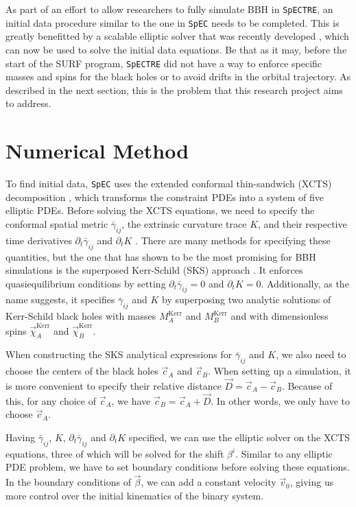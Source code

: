 \documentclass{../document}
\begin{document}
	As part of an effort to allow researchers to fully simulate BBH in {\tt SpECTRE}, an initial data procedure similar to the one in {\tt SpEC} needs to be completed. This is greatly benefitted by a scalable elliptic solver that was recently developed \cite{Vu}, which can now be used to solve the initial data equations. Be that as it may, before the start of the SURF program, {\tt SpECTRE} did not have a way to enforce specific masses and spins for the black holes or to avoid drifts in the orbital trajectory. As described in the next section, this is the problem that this research project aims to address.
  
  \section{Numerical Method}

  To find initial data, {\tt SpEC} uses the extended conformal thin-sandwich (XCTS) decomposition \cite{Serguei}, which transforms the constraint PDEs into a system of five elliptic PDEs. Before solving the XCTS equations, we need to specify the conformal spatial metric $\bar\gamma_{ij}$, the extrinsic curvature trace $K$, and their respective time derivatives $\partial_t \bar\gamma_{ij}$ and $\partial_t K$ \cite{BaumgarteShapiro}. There are many methods for specifying these quantities, but the one that has shown to be the most promising for BBH simulations is the superposed Kerr-Schild (SKS) approach \cite{Lovelace2008}. It enforces quasiequilibrium conditions by setting $\partial_t \bar\gamma_{ij}=0$ and $\partial_t K=0$. Additionally, as the name suggests, it specifies $\bar\gamma_{ij}$ and $K$ by superposing two analytic solutions of Kerr-Schild black holes with masses $M^\text{Kerr}_A$ and $M^\text{Kerr}_B$ and with dimensionless spins $\vec\chi^\text{Kerr}_A$ and $\vec\chi^\text{Kerr}_B$.

  When constructing the SKS analytical expressions for $\bar\gamma_{ij}$ and $K$, we also need to choose the centers of the black holes $\vec c_A$ and $\vec c_B$. When setting up a simulation, it is more convenient to specify their relative distance $\vec D=\vec c_A - \vec c_B$. Because of this, for any choice of $\vec c_A$, we have $\vec c_B = \vec c_A + \vec D$. In other words, we only have to choose $\vec c_A$.

  Having $\bar\gamma_{ij}$, $K$, $\partial_t \bar\gamma_{ij}$ and $\partial_t K$ specified, we can use the elliptic solver on the XCTS equations, three of which will be solved for the shift $\beta^i$. Similar to any elliptic PDE problem, we have to set boundary conditions before solving these equations. In the boundary conditions of $\vec\beta$, we can add a constant velocity $\vec v_0$, giving us more control over the initial kinematics of the binary system.
\end{document}
